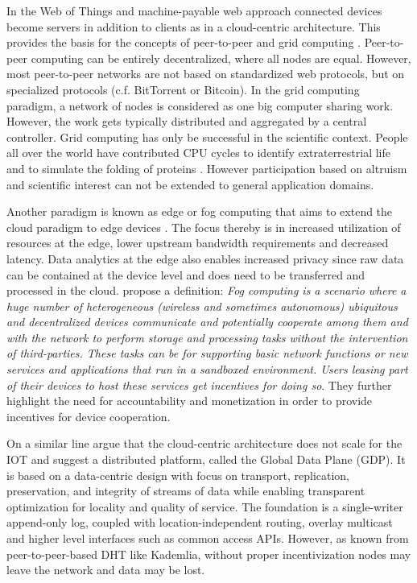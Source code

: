 In the Web of Things and machine-payable web approach connected devices become servers in addition to clients as in a cloud-centric architecture. This provides the basis for the concepts of peer-to-peer \parencite{Rodrigues:2010:PS:1831407.1831427} and grid computing \parencite{Anderson2004boinc}. Peer-to-peer computing can be entirely decentralized, where all nodes are equal. However, most peer-to-peer networks are not based on standardized web protocols, but on specialized protocols (c.f. BitTorrent or Bitcoin). In the grid computing paradigm, a network of nodes is considered as one big computer sharing work. However, the work gets typically distributed and aggregated by a central controller. Grid computing has only be successful in the scientific context. People all over the world have contributed CPU cycles to identify extraterrestrial life \parencite{Anderson:2002:SEP:581571.581573} and to simulate the folding of proteins \parencite{Beberg2009Folding}. However participation based on altruism and scientific interest can not be extended to general application domains.   

Another paradigm is known as edge or fog computing that aims to extend the cloud paradigm to edge devices \parencite{Bonomi:2012:FCR:2342509.2342513,ISI:000343986300007,Yi:2015:SFC:2757384.2757397}. The focus thereby is in increased utilization of resources at the edge, lower upstream bandwidth requirements and decreased latency. Data analytics at the edge also enables increased privacy since raw data can be contained at the device level and does need to be transferred and processed in the cloud. \cite{ISI:000343986300007} propose a definition: \emph{Fog computing is a scenario where a huge number of heterogeneous (wireless and sometimes autonomous) ubiquitous and decentralized devices communicate and potentially cooperate among them and with the network to perform storage and processing tasks without the intervention of third-parties. These tasks can be for supporting basic network functions or new services and applications that run in a sandboxed environment. Users leasing part of their devices to host these services get incentives for doing so}. They further highlight the need for accountability and monetization in order to provide incentives for device cooperation. 

On a similar line \cite{Zhang:2015} argue that the cloud-centric architecture does not scale for the \ac{IOT} and suggest a distributed platform, called the Global Data Plane (GDP). It is based on a data-centric design with focus on transport, replication, preservation, and integrity of streams of data while enabling transparent optimization for locality and quality of service. The foundation is a single-writer append-only log, coupled with location-independent routing, overlay multicast and higher level interfaces such as common access \ac{API}s. However, as known from peer-to-peer-based \ac{DHT} like Kademlia, without proper incentivization nodes may leave the network and data may be lost. 

